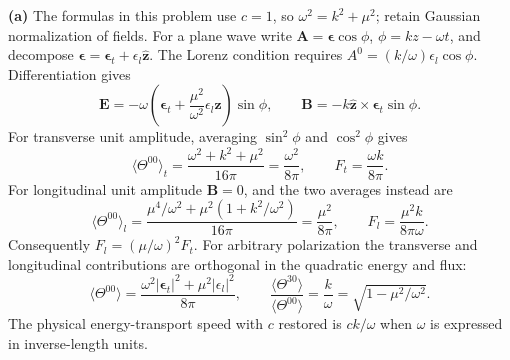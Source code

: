 \medskip\noindent\textbf{(a)} The formulas in this problem use $c=1$, so
$\omega^2=k^2+\mu^2$; retain Gaussian normalization of fields.
For a plane wave write
$\mathbf A=\boldsymbol\epsilon\cos\phi$, $\phi=kz-\omega t$,
and decompose $\boldsymbol\epsilon=\boldsymbol\epsilon_t+
\epsilon_l\widehat{\mathbf z}$.
The Lorenz condition requires
$A^0=(k/\omega)\epsilon_l\cos\phi$.  Differentiation gives
\[
\mathbf E=-\omega\left(\boldsymbol\epsilon_t+
 \frac{\mu^2}{\omega^2}\epsilon_l\widehat{\mathbf z}\right)\sin\phi,
\qquad
\mathbf B=-k\widehat{\mathbf z}\times\boldsymbol\epsilon_t\sin\phi.
\]
For transverse unit amplitude, averaging $\sin^2\phi$ and
$\cos^2\phi$ gives
\[
\langle\Theta^{00}\rangle_t
=\frac{\omega^2+k^2+\mu^2}{16\pi}=\frac{\omega^2}{8\pi},
\qquad F_t=\frac{\omega k}{8\pi}.
\]
For longitudinal unit amplitude $\mathbf B=0$, and the two
averages instead are
\[
\langle\Theta^{00}\rangle_l
=\frac{\mu^4/\omega^2+\mu^2(1+k^2/\omega^2)}{16\pi}
=\frac{\mu^2}{8\pi},\qquad
F_l=\frac{\mu^2k}{8\pi\omega}.
\]
Consequently $F_l=(\mu/\omega)^2F_t$.
For arbitrary polarization the transverse and longitudinal
contributions are orthogonal in the quadratic energy and flux:
\[
\langle\Theta^{00}\rangle
=\frac{\omega^2|\boldsymbol\epsilon_t|^2+\mu^2|\epsilon_l|^2}{8\pi},
\qquad
\boxed{\frac{\langle\Theta^{30}\rangle}{\langle\Theta^{00}\rangle}
=\frac k\omega=\sqrt{1-\mu^2/\omega^2}.}
\]
The physical energy-transport speed with $c$ restored is $ck/\omega$
when $\omega$ is expressed in inverse-length units.


